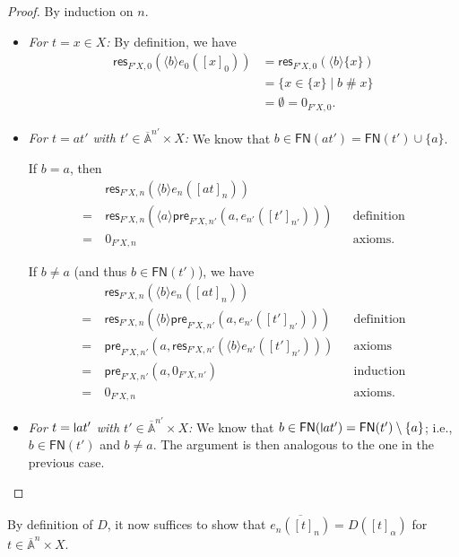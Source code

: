 \documentclass[11pt,a4paper]{amsart}
\newcommand{\pre}{\mathsf{pre}}
\newcommand{\res}{\mathsf{res}}
\newcommand{\FN}{\mathsf{FN}}
\newcommand{\Names}{\mathbb{A}}
\newcommand{\barNames}{\overline{\Names}}
\newcommand{\fresh}{\mathbin{\#}}
\newcommand{\bind}[1]{\langle #1\rangle}
\theoremstyle{plain}
\newcommand{\midmid}{\hspace{0.2ex}{\rule[-0.1ex]{0.6pt}{1.65ex}}\hspace{0.2ex}}
\newcommand{\newletter}[1]{{\midmid}#1}
\numberwithin{equation}{section}
\newcommand{\+}[1]{\mathcal{#1}\xspace}
\theoremstyle{definition}
\begin{document}
\begin{proof}
  By induction on \(n\).
  \begin{itemize}
    \item \emph{For \(t = x \in X\):}
      By definition, we have
      \begin{align*}
        \res_{F'X, 0}(\bind{b} e_0([x]_0))
        &= \res_{F'X, 0}(\bind{b} \{x\}) \\
        &= \{x \in \{x\} \mid b \fresh x\} \\
        &= \emptyset = 0_{F'X, 0}.
      \end{align*}
    \item \emph{For \(t = at'\) with \(t' \in \barNames^{n'} \times X\):}
      We know that \(b \in \FN(at') = \FN(t') \cup \{a\}\).

      If \(b = a\), then
      \begin{align*}
        &\res_{F'X, n}(\bind{b} e_n([at]_n)) \\
        =~&\res_{F'X, n}(\bind{a} \pre_{F'X, n'}(a, e_{n'}([t']_{n'}))) && \text{definition} \\
        =~&0_{F'X, n} && \text{axioms}.
      \end{align*}

      If \(b \neq a\) (and thus \(b \in \FN(t')\)), we have
      \begin{align*}
        &\res_{F'X, n}(\bind{b} e_n([at]_n)) \\
        =~&\res_{F'X, n}(\bind{b} \pre_{F'X, n'}(a, e_{n'}([t']_{n'}))) && \text{definition} \\
        =~&\pre_{F'X, n'}(a, \res_{F'X, n'}(\bind{b} e_{n'}([t']_{n'}))) && \text{axioms} \\
        =~&\pre_{F'X, n'}(a, 0_{F'X, n'}) && \text{induction} \\
        =~&0_{F'X, n} && \text{axioms}.
      \end{align*}
    \item \emph{For \(t = \newletter{a}t'\) with \(t' \in \barNames^{n'} \times X\):}
      We know that \(b \in \FN(\newletter{a}t') = \FN(t') \setminus \{a\}\); i.e., \(b \in \FN(t')\) and \(b \neq a\).
      The argument is then analogous to the one in the previous case.
  \end{itemize}
\end{proof}

\noindent By definition of \(D\), it now suffices to show that \(\overline{e_n([t]_n)} = D([t]_\alpha)\) for \(t \in \barNames^n \times X\).
\end{document}
